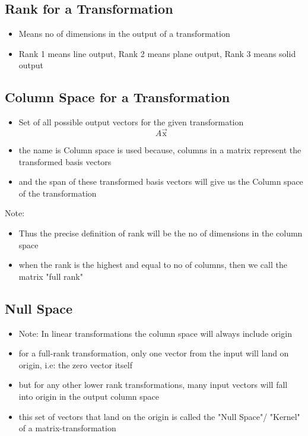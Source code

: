\documentclass[a4paper]{article}
\begin{document}
\subsection{Rank for a Transformation}
\begin{itemize}
	\item Means no of dimensions in the output of a transformation
	\item Rank 1 means line output, \newline
	      Rank 2 means plane output, \newline
	      Rank 3 means solid output
\end{itemize}

\subsection{Column Space for a Transformation}
\begin{itemize}
	\item Set of all possible output vectors for the given transformation
	      \[
		      A \vec{\text{x}}
	      \]
	\item the name is Column space is used because,
	      columns in a matrix represent the transformed basis vectors
	\item and the span of these transformed basis vectors will give us the
	      Column space of the transformation
\end{itemize}

Note:
\begin{itemize}
	\item Thus the precise definition of rank will be the no of dimensions in
	      the column space
	\item  when the rank is the highest and equal to no of columns,
	      then we call the matrix "full rank"
\end{itemize}

\subsection{Null Space}
\begin{itemize}
	\item Note: In linear transformations the column space will always include
	      origin
	\item for a full-rank transformation, only one vector from the input
	      will land on origin, i.e: the zero vector itself
	\item but for any other lower rank transformations, many input
	      vectors will fall into origin in the output column space
	\item this set of vectors that land on the origin is called the
	      "Null Space"/ "Kernel" of a matrix-transformation
\end{itemize}
\end{document}
